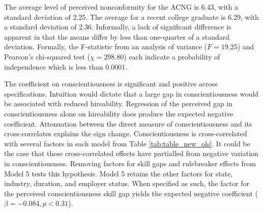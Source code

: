 \documentclass[review]{elsarticle}
\begin{document}
The average level of perceived nonconformity for the ACNG is 6.43, with a standard deviation of 2.25.
The average for a recent college graduate is 6.29, with a standard deviation of 2.36.
Informally, a lack of significant difference is apparent in that the means differ by less than one-quarter of a standard deviation.
Formally, the F-statistic from an analysis of variance ($F = 19.25$) and Pearson's chi-squared test ($\chi = 298.80$) each indicate a probability of independence which is less than 0.0001.

The coefficient on conscientiousness is significant and positive across specifications.
Intuition would dictate that a large gap in conscientiousness would be associated with reduced hireability.
Regression of the perceived gap in conscientiousness alone on hireability does produce the expected negative coefficient.
Attenuation between the direct measure of conscientiousness and its cross-correlates explains the sign change.
Conscientiousness is cross-correlated with several factors in each model from Table \ref{tab:table_new_ols}.
It could be the case that these cross-correlated effects have partialled from negative variation in conscientiousness.
Removing factors for skill gaps and rulebreaker effects from Model 5 tests this hypothesis.
Model 5 retains the other factors for state, industry, duration, and employer status.
When specified as such, the factor for the perceived conscientiousness skill gap yields the expected negative coefficient ($\beta = -0.084, p < 0.31$).
\end{document}
